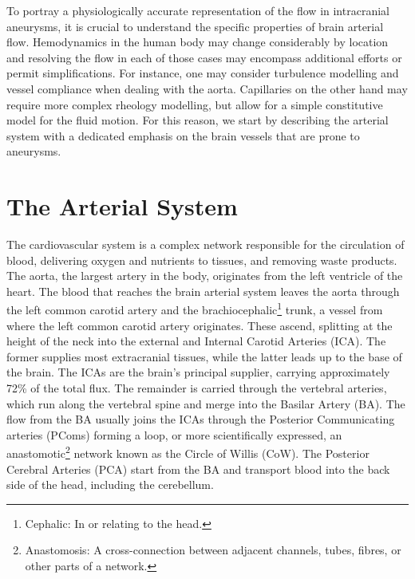To portray a physiologically accurate representation of the flow in intracranial aneurysms, it is crucial to understand the specific properties of brain arterial flow. Hemodynamics in the human body may change considerably by location and resolving the flow in each of those cases may encompass additional efforts or permit simplifications. For instance, one may consider turbulence modelling and vessel compliance when dealing with the aorta. Capillaries on the other hand may require more complex rheology modelling, but allow for a simple constitutive model for the fluid motion. For this reason, we start by describing the arterial system with a dedicated emphasis on the brain vessels that are prone to aneurysms.

\section{The Arterial System}\label{chap3:sec1}
The cardiovascular system is a complex network responsible for the circulation of blood, delivering oxygen and nutrients to tissues, and removing waste products. The aorta, the largest artery in the body, originates from the left ventricle of the heart. The blood that reaches the brain arterial system leaves the aorta through the left common carotid artery and the brachiocephalic\footnote{Cephalic: In or relating to the head.} trunk, a vessel from where the left common carotid artery originates. These ascend, splitting at the height of the neck into the external and Internal Carotid Arteries (ICA). The former supplies most extracranial tissues, while the latter leads up to the base of the brain. The ICAs are the brain's principal supplier, carrying approximately 72\% of the total flux\cite{Zarrinkoob2015}. The remainder is carried through the vertebral arteries, which run along the vertebral spine and merge into the Basilar Artery (BA). The flow from the BA usually joins the ICAs through the Posterior Communicating arteries (PComs) forming a loop, or more scientifically expressed, an anastomotic\footnote{Anastomosis: A cross-connection between adjacent channels, tubes, fibres, or other parts of a network.} network known as the Circle of Willis (CoW). The Posterior Cerebral Arteries (PCA) start from the BA and transport blood into the back side of the head, including the cerebellum.

